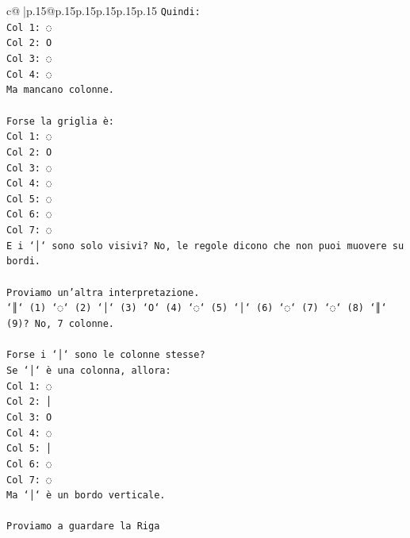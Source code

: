 \documentclass{article}
\begin{document}
{\begin{supertabular}{c@{$\;$}|p{.15\linewidth}@{}p{.15\linewidth}p{.15\linewidth}p{.15\linewidth}p{.15\linewidth}p{.15\linewidth}}
{{{\texttt{Quindi:} \\
\texttt{Col 1: ◌} \\
\texttt{Col 2: O} \\
\texttt{Col 3: ◌} \\
\texttt{Col 4: ◌} \\
\texttt{Ma mancano colonne.} \\
\\ 
\texttt{Forse la griglia è:} \\
\texttt{Col 1: ◌} \\
\texttt{Col 2: O} \\
\texttt{Col 3: ◌} \\
\texttt{Col 4: ◌} \\
\texttt{Col 5: ◌} \\
\texttt{Col 6: ◌} \\
\texttt{Col 7: ◌} \\
\texttt{E i `│` sono solo visivi? No, le regole dicono che non puoi muovere su bordi.} \\
\\ 
\texttt{Proviamo un'altra interpretazione.} \\
\texttt{`║` (1) `◌` (2) `│` (3) `O` (4) `◌` (5) `│` (6) `◌` (7) `◌` (8) `║` (9)? No, 7 colonne.} \\
\\ 
\texttt{Forse i `│` sono le colonne stesse?} \\
\texttt{Se `│` è una colonna, allora:} \\
\texttt{Col 1: ◌} \\
\texttt{Col 2: │} \\
\texttt{Col 3: O} \\
\texttt{Col 4: ◌} \\
\texttt{Col 5: │} \\
\texttt{Col 6: ◌} \\
\texttt{Col 7: ◌} \\
\texttt{Ma `│` è un bordo verticale.} \\
\\ 
\texttt{Proviamo a guardare la Riga} \\
            }
        }
    }
     \\ \\


\end{supertabular}}
\end{document}
